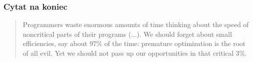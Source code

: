\documentclass{beamer}
\begin{document}
    \begin{frame}
        \frametitle{Cytat na koniec}
        \begin{quote}
            Programmers waste enormous amounts of time thinking
            about the speed of noncritical parts of their programs (...). We
            should forget about small efficiencies, say about 97\% of the
            time: premature optimization is the root of all evil. Yet we
            should not pass up our opportunities in that critical 3\%.
        \end{quote}
        \hspace*{}
    \end{frame}
\end{document}
